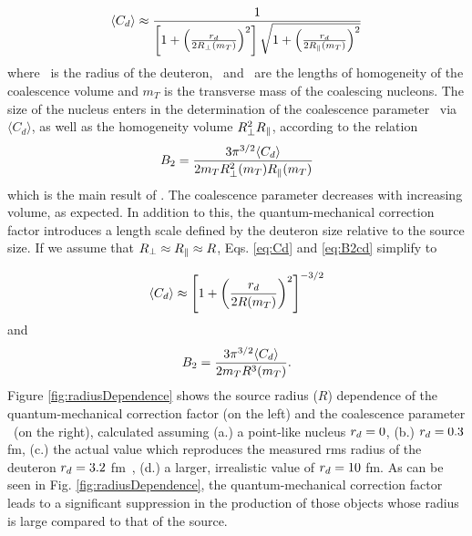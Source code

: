 \begin{equation}
\langle C_{d} \rangle \approx \frac{1}{\left[1+ \left(\frac{r_{d}}{2R_{\perp}(m_{T})}\right)^{2}\right] \sqrt{1+ \left(\frac{r_{d}}{2R_{\|}(m_{T})}\right)^{2}}}
\label{eq:Cd}
\end{equation}
%
where \dradius~is the radius of the deuteron, \rperp~and \rpar~are the lengths of homogeneity of the coalescence volume and $m_{T}$ is the transverse mass of the coalescing nucleons.
The size of the nucleus enters in the determination of the coalescence parameter \btwo~via $\langle C_{d} \rangle$, as well as the homogeneity volume $R_{\perp}^{2}R_{\|}$, according to the relation
%
\begin{equation}
B_{2} = \frac{3\pi^{3/2} \langle C_{d} \rangle}{2m_{T}R_{\perp}^{2}(m_{T})R_{\|}(m_{T})}
\label{eq:B2cd}
\end{equation}
%
which is the main result of \cite{Scheibl:1998tk}. The coalescence parameter decreases with increasing volume, as expected. In addition to this, the quantum-mechanical correction factor introduces a length scale defined by the deuteron size relative to the source size. 
If we assume that  $R_{\perp} \approx R_{\|} \approx R$, Eqs. \ref{eq:Cd} and \ref{eq:B2cd} simplify to 

\begin{equation}
\langle C_{d} \rangle \approx \left[1+ \left(\frac{r_{d}}{2R(m_{T})}\right)^{2}\right]^{-3/2}
\label{eq:Cdapprox}
\end{equation}
%
and
%
\begin{equation}
B_{2} = \frac{3\pi^{3/2} \langle C_{d} \rangle}{2m_{T}R^{3}(m_{T})}.
\label{eq:B2approx}
\end{equation}
%
Figure \ref{fig:radiusDependence} shows the source radius ($R$) dependence of the quantum-mechanical correction factor (on the left) and the coalescence parameter \btwo~(on the right), calculated assuming (a.) a point-like nucleus $r_{d} = 0$, (b.) $r_{d} = 0.3$ fm, (c.) the actual value which reproduces the measured rms radius of the deuteron $r_{d} = 3.2$ fm~\cite{Mohr:2015ccw}, (d.) a larger, irrealistic value of  $r_{d} = 10$ fm. 
As can be seen in Fig. \ref{fig:radiusDependence}, the quantum-mechanical correction factor leads to a significant suppression in the production of those objects whose radius is large compared to that of the source. 

